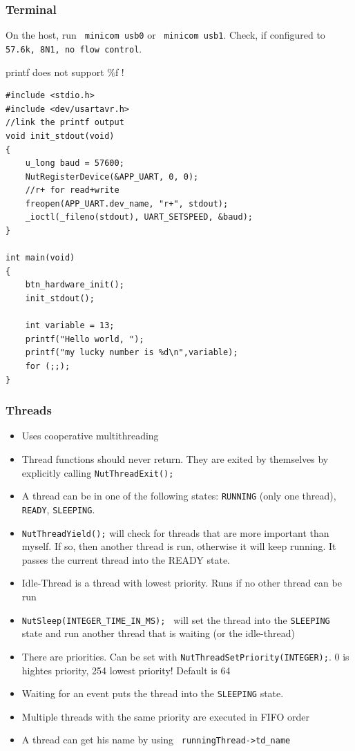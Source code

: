 \subsubsection{Terminal}
On the host, run \texttt{ minicom usb0} or \texttt{ minicom usb1}. Check, if configured to \texttt{57.6k, 8N1, no flow control}.
\begin{tnote}
printf does not support \%f !
\end{tnote}

\begin{lstlisting}[basicstyle=\small]
#include <stdio.h>
#include <dev/usartavr.h>
//link the printf output
void init_stdout(void)
{
	u_long baud = 57600;
	NutRegisterDevice(&APP_UART, 0, 0);
	//r+ for read+write
	freopen(APP_UART.dev_name, "r+", stdout);
	_ioctl(_fileno(stdout), UART_SETSPEED, &baud);
}

int main(void)
{
	btn_hardware_init();
	init_stdout();

	int variable = 13;
	printf("Hello world, ");
	printf("my lucky number is %d\n",variable);
	for (;;);
}

\end{lstlisting}

\subsubsection{Threads}

\begin{itemize}[noitemsep]
\item Uses cooperative multithreading
\item Thread functions should never return. They are exited by themselves by explicitly calling \texttt{NutThreadExit();}
\item A thread can be in one of the following states: \texttt{RUNNING} (only one thread), \texttt {READY}, \texttt{SLEEPING}.
\item \texttt{NutThreadYield();} will check for threads that are more important than myself. If so, then another thread is run, otherwise it will keep running. It passes the current thread into the READY state.
\item Idle-Thread is a thread with lowest priority. Runs if no other thread can be run
\item \texttt{NutSleep(INTEGER\_TIME\_IN\_MS); } will set the thread into the \texttt{SLEEPING} state and run another thread that is waiting (or the idle-thread)
\item There are priorities. Can be set with \texttt{NutThreadSetPriority(INTEGER);}. 0 is hightes priority, 254 lowest priority! Default is 64
\item Waiting for an event puts the thread into the \texttt{SLEEPING} state.
\item Multiple threads with the same priority are executed in FIFO order
\item A thread can get his name by using \texttt{ runningThread->td\_name}
\end{itemize}


